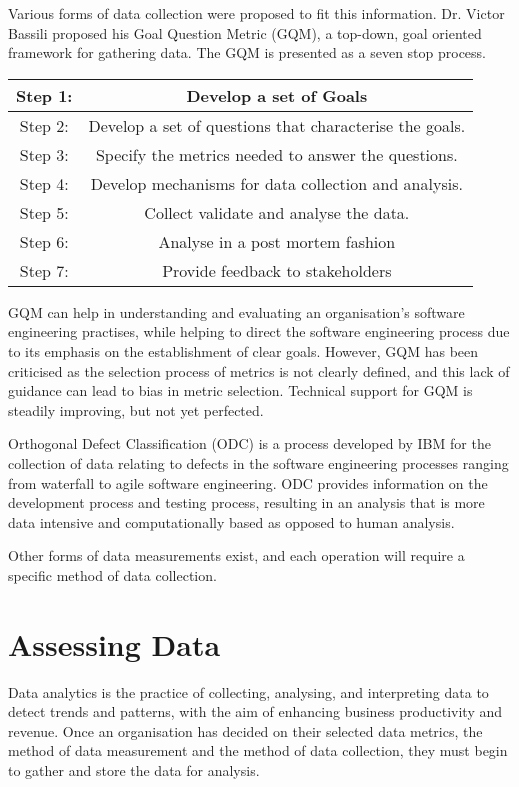 \documentclass{article}
\begin{document}
Various forms of data collection were proposed to fit this information. Dr. Victor Bassili proposed his Goal Question Metric (GQM), a top-down, goal oriented framework for gathering data. The GQM is presented as a seven stop process. \cite{wiki}

\begin{center}
\begin{tabular}{||c c||} 
\hline
Step 1: & Develop a set of Goals \\ 
\hline
Step 2: & Develop a set of questions that characterise the goals. \\ 
\hline
Step 3: & Specify the metrics needed to answer the questions. \\
\hline
Step 4: & Develop mechanisms for data collection and analysis. \\
\hline
Step 5: & Collect validate and analyse the data. \\
\hline
Step 6: & Analyse in a post mortem fashion \\ 
\hline
Step 7: & Provide feedback to stakeholders \\
\hline
\end{tabular}
\end{center}

GQM can help in understanding and evaluating an organisation's software engineering practises, while helping to direct the software engineering process due to its emphasis on the establishment of clear goals. However, GQM has been criticised as the selection process of metrics is not clearly defined, and this lack of guidance can lead to bias in metric selection. Technical support for GQM is steadily improving, but not yet perfected. \newline 

Orthogonal Defect Classification (ODC) is a process developed by IBM for the collection of data relating to defects in the software engineering processes ranging from waterfall to agile software engineering. \cite{ODC} ODC provides information on the development process and testing process, resulting in an analysis that is more data intensive and computationally based as opposed to human analysis. \newline

Other forms of data measurements exist, and each operation will require a specific method of data collection.

\section{Assessing Data} Data analytics is the practice of collecting, analysing, and interpreting data to detect trends and patterns, with the aim of enhancing business productivity and revenue. Once an organisation has decided on their selected data metrics, the method of data measurement and the method of data collection, they must begin to gather and store the data for analysis. \newline
\end{document}
